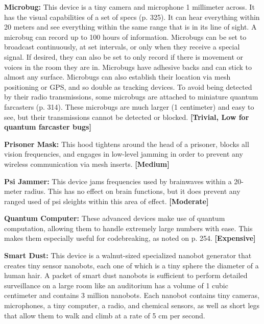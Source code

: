 \textbf{Microbug:} This device is a tiny camera and microphone 1 millimeter across. It has the visual capabilities of a set of specs (p. 325). It can hear everything within 20 meters and see everything within the same range that is in its line of sight. A microbug can record up to 100 hours of information. Microbugs can be set to broadcast continuously, at set intervals, or only when they receive a special signal. If desired, they can also be set to only record if there is movement or voices in the room they are in. Microbugs have adhesive backs and can stick to almost any surface. Microbugs can also establish their location via mesh positioning or GPS, and so double as tracking devices. To avoid being detected by their radio transmissions, some microbugs are attached to miniature quantum farcasters (p. 314). These microbugs are much larger (1 centimeter) and easy to see, but their transmissions cannot be detected or blocked. \textbf{[Trivial, Low for quantum farcaster bugs]} 

\textbf{Prisoner Mask: }This hood tightens around the head of a prisoner, blocks all vision frequencies, and engages in low-level jamming in order to prevent any wireless communication via mesh inserts. \textbf{[Medium]} 

\textbf{Psi Jammer:} This device jams frequencies used by brainwaves within a 20-meter radius. This has no effect on brain functions, but it does prevent any ranged used of psi sleights within this area of effect. \textbf{[Moderate]} 

\textbf{Quantum Computer:} These advanced devices make use of quantum computation, allowing them to handle extremely large numbers with ease. This makes them especially useful for codebreaking, as noted on p. 254. \textbf{[Expensive]} 

\textbf{Smart Dust:} This device is a walnut-sized specialized nanobot generator that creates tiny sensor nanobots, each one of which is a tiny sphere the diameter of a human hair. A packet of smart dust nanobots is sufficient to perform detailed surveillance on a large room like an auditorium has a volume of 1 cubic centimeter and contains 3 million nanobots. Each nanobot contains tiny cameras, microphones, a tiny computer, a radio, and chemical sensors, as well as short legs that allow them to walk and climb at a rate of 5 cm per second. 

